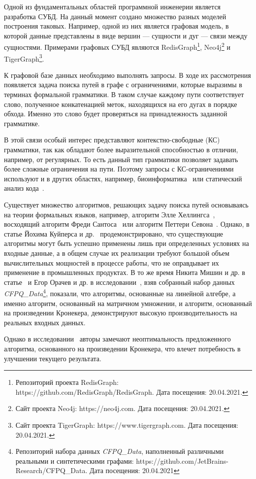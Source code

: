 
Одной из фундаментальных областей программной инженерии является разработка СУБД. На данный момент создано множество разных моделей построения таковых. Например, одной из них является графовая модель, в которой данные представлены в виде вершин --- сущности и дуг --- связи между сущностями. Примерами графовых СУБД являются RedisGraph\footnote{Репозиторий проекта RedisGraph: https://github.com/RedisGraph/RedisGraph. Дата посещения: 20.04.2021.}, Neo4j\footnote{Сайт проекта Neo4j: https://neo4j.com. Дата посещения: 20.04.2021.} и TigerGraph\footnote{Сайт проекта TigerGraph: https://www.tigergraph.com. Дата посещения: 20.04.2021.}.

К графовой базе данных необходимо выполнять запросы. В ходе их рассмотрения появляется задача поиска путей в графе с ограничениями, которые выразимы в терминах формальной грамматики. В таком случае каждому пути соответствует слово, полученное конкатенацией меток, находящихся на его дугах в порядке обхода. Именно это слово будет проверяться на принадлежность заданной грамматике.

В этой связи особый интерес представляют контекстно-свободные (КС) грамматики, так как обладают более выразительной способностью в отличии, например, от регулярных. То есть данный тип грамматики позволяет задавать более сложные ограничения на пути. Поэтому запросы с КС-ограничениями используют и в других областях, например, биоинформатика~\cite{Bio} или статический анализ кода~\cite{Stat}.

Существует множество алгоритмов, решающих задачу поиска путей основываясь на теории формальных языков, например, алгоритм Элле Хеллингса~\cite{Hellings2015PathRF}, восходящий алгоритм Фреди Сантоса~\cite{inbook} или алгоритм Петтери Севона~\cite{Bio}. Однако, в статье Йохима Куйперса и др.~\cite{oper_matrix} продемонстрировано, что существующие алгоритмы могут быть успешно применены лишь при определенных условиях на входные данные, а в общем случае их реализации требуют большой объем вычислительных мощностей в процессе работы, что не оправдывает их применение в промышленных продуктах. В то же время Никита Мишин и др. в статье~\cite{mishin} и Егор Орачев и др. в исследовании~\cite{10.1007/978-3-030-54832-2_6}, взяв собранный набор данных \textit{CFPQ\_Data}\footnote{Репозиторий набора данных \textit{CFPQ\_Data}, наполненный различными реальными и синтетическими графами: https://github.com/JetBrains-Research/CFPQ\_Data. Дата посещения: 20.04.2021}, показали, что алгоритмы, основанные на линейной алгебре, а именно алгоритм, основанный на матричном умножении, и алгоритм, основанный на произведении Кронекера, демонстрируют высокую производительность на реальных входных данных. 

Однако в исследовании~\cite{10.1007/978-3-030-54832-2_6} авторы замечают неоптимальность предложенного алгоритма, основанного на произведении Кронекера, что влечет потребность в улучшении текущего результата.